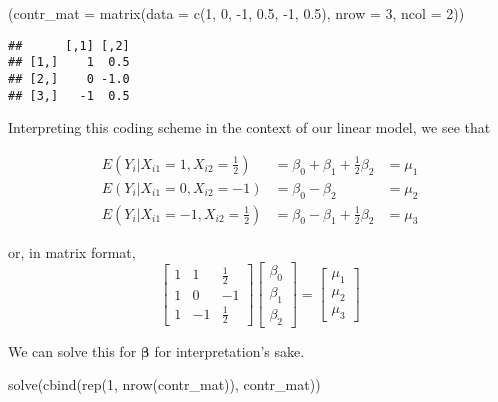 \documentclass[
]{book}
\newenvironment{Shaded}{\begin{snugshade}}{\end{snugshade}}
\newcommand{\AttributeTok}[1]{\textcolor[rgb]{0.77,0.63,0.00}{#1}}
\newcommand{\DecValTok}[1]{\textcolor[rgb]{0.00,0.00,0.81}{#1}}
\newcommand{\FloatTok}[1]{\textcolor[rgb]{0.00,0.00,0.81}{#1}}
\newcommand{\FunctionTok}[1]{\textcolor[rgb]{0.00,0.00,0.00}{#1}}
\newcommand{\NormalTok}[1]{#1}
\newcommand{\SpecialCharTok}[1]{\textcolor[rgb]{0.00,0.00,0.00}{#1}}
\begin{document}
\begin{Shaded}
\begin{Highlighting}[]
\NormalTok{(}\AttributeTok{contr\_mat =} \FunctionTok{matrix}\NormalTok{(}\AttributeTok{data =} \FunctionTok{c}\NormalTok{(}\DecValTok{1}\NormalTok{, }\DecValTok{0}\NormalTok{, }\SpecialCharTok{{-}}\DecValTok{1}\NormalTok{, }\FloatTok{0.5}\NormalTok{, }\SpecialCharTok{{-}}\DecValTok{1}\NormalTok{, }\FloatTok{0.5}\NormalTok{),}
    \AttributeTok{nrow =} \DecValTok{3}\NormalTok{, }\AttributeTok{ncol =} \DecValTok{2}\NormalTok{))}
\end{Highlighting}
\end{Shaded}

\begin{verbatim}
##      [,1] [,2]
## [1,]    1  0.5
## [2,]    0 -1.0
## [3,]   -1  0.5
\end{verbatim}

Interpreting this coding scheme in the context of our linear model, we
see that

\[
\begin{aligned}
E(Y_i|X_{i1}=1,X_{i2}=\tfrac{1}{2}) &= \beta_0+\beta_1+\tfrac{1}{2}\beta_2 &= \mu_1 \\
E(Y_i|X_{i1}=0,X_{i2}=-1) &= \beta_0-\beta_2 &= \mu_2\\
E(Y_i|X_{i1}=-1,X_{i2}=\tfrac{1}{2}) &= \beta_0-\beta_1+\tfrac{1}{2}\beta_2 &= \mu_3
\end{aligned}
\]

or, in matrix format,
\[
\begin{bmatrix}
1 & 1 & \tfrac{1}{2} \\
1 & 0 & -1 \\
1 & -1 & \tfrac{1}{2}
\end{bmatrix}
\begin{bmatrix}
\beta_0 \\
\beta_1  \\
\beta_2 
\end{bmatrix}
=
\begin{bmatrix}
\mu_1 \\
\mu_2  \\
\mu_3 
\end{bmatrix}
\]

We can solve this for \(\boldsymbol{\beta}\) for interpretation's sake.

\begin{Shaded}
\begin{Highlighting}[]
\FunctionTok{solve}\NormalTok{(}\FunctionTok{cbind}\NormalTok{(}\FunctionTok{rep}\NormalTok{(}\DecValTok{1}\NormalTok{, }\FunctionTok{nrow}\NormalTok{(contr\_mat)), contr\_mat))}
\end{Highlighting}
\end{Shaded}
\end{document}
